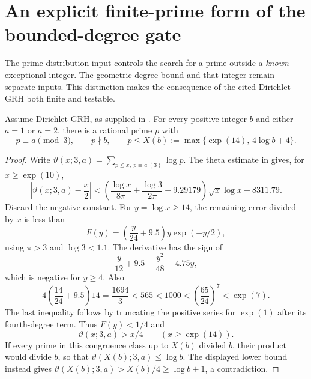 \section{An explicit finite-prime form of the bounded-degree gate}
\label{sec:finite-prime-gate}

The prime distribution input controls the search for a prime outside a
\emph{known} exceptional integer. The geometric degree bound and that
integer remain separate inputs. This distinction makes the consequence
of the cited Dirichlet GRH both finite and testable.

\begin{proposition}[R30]
\label{prop:R30}
Assume Dirichlet GRH, as supplied in \cite{Alpoge2026}. For every positive
integer $b$ and either $a=1$ or $a=2$, there is a rational prime $p$ with
\[
 p\equiv a\pmod3,\qquad p\nmid b,\qquad
 p\leq X(b):=\max\{\exp(14),\,4\log b+4\}.
\]
\end{proposition}

\begin{proof}
Write $\vartheta(x;3,a)=\sum_{p\leq x,\ p\equiv a\ (3)}\log p$.
The theta estimate in \cite[Corollary 1.1 and Table 1, row
$\log x_0=10$, p.~2]{Lee2023} gives, for $x\geq\exp(10)$,
\[
 \left|\vartheta(x;3,a)-\frac{x}{2}\right|
 <\left(\frac{\log x}{8\pi}+\frac{\log3}{2\pi}+9.29179\right)
       \sqrt{x}\log x-8311.79.
\]
Discard the negative constant. For $y=\log x\geq14$, the remaining
error divided by $x$ is less than
\[
 F(y)=\left(\frac{y}{24}+9.5\right)y\exp(-y/2),
\]
using $\pi>3$ and $\log3<1.1$. The derivative has the sign of
\[
 \frac y{12}+9.5-\frac{y^2}{48}-4.75y,
\]
which is negative for $y\geq4$. Also
\[
 4\left(\frac{14}{24}+9.5\right)14
 =\frac{1694}{3}<565<1000
 <\left(\frac{65}{24}\right)^7<\exp(7).
\]
The last inequality follows by truncating the positive series for
$\exp(1)$ after its fourth-degree term. Thus $F(y)<1/4$ and
\[
 \vartheta(x;3,a)>x/4\qquad(x\geq\exp(14)).
\]
If every prime in this congruence class up to $X(b)$ divided $b$, their
product would divide $b$, so that
$\vartheta(X(b);3,a)\leq\log b$. The displayed lower bound instead gives
$\vartheta(X(b);3,a)>X(b)/4\geq\log b+1$, a contradiction.
\end{proof}

